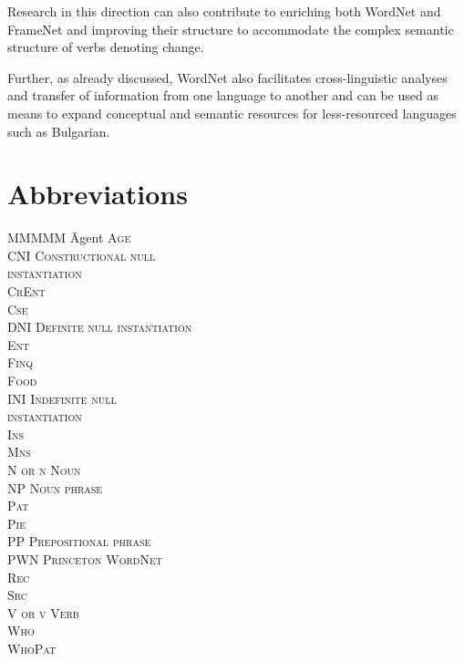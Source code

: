 \documentclass[output=paper,colorlinks,citecolor=brown]{langscibook}
\begin{document}
Research in this direction can also contribute to enriching both WordNet and FrameNet and improving their structure to accommodate the complex semantic structure of verbs denoting change.


Further, as already discussed, WordNet also facilitates cross-linguistic analyses and transfer of information from one language to another and can be used as means to expand conceptual and semantic resources for less-resourced languages such as Bulgarian.


\section*{Abbreviations}

\begin{multicols}{2}
\begin{tabbing}
MMMMM \= Agent\kill
\scshape Age \> \\
CNI \> Constructional null \\ \> instantiation\\
\scshape CrEnt \> \\
\scshape Cse \> \\
DNI \> Definite null instantiation\\
\scshape Ent \> \\
\scshape Finq \> \\
\scshape Food \> \\
INI \> Indefinite null \\ \> instantiation\\
\scshape Ins \> \\
\scshape Mns \> \\
N or n \> Noun\\
NP \> Noun phrase\\
\scshape Pat \> \\
\scshape Pie \> \\
PP \> Prepositional phrase\\
PWN \> Princeton WordNet\\
\scshape Rec \> \\
\scshape Src \> \\
V or v \> Verb\\
\scshape Who \> \\
\scshape WhoPat \> 
\end{tabbing}
\end{multicols}
\end{document}
